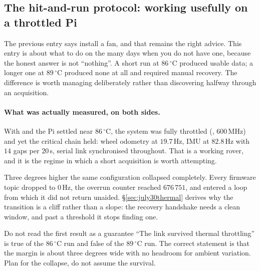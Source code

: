 \subsection{The hit-and-run protocol: working usefully on a throttled Pi}
\label{ap:repro-hitrun}
The previous entry says install a fan, and that remains the right advice. This
entry is about what to do on the many days when you do not have one, because
the honest answer is not ``nothing''. A short run at $86\,^\circ$C produced
usable data; a longer one at $89\,^\circ$C produced none at all and required
manual recovery. The difference is worth managing deliberately rather than
discovering halfway through an acquisition.

\paragraph{What was actually measured, on both sides.}
With  and the Pi settled near $86\,^\circ$C, the
system was fully throttled (, $600$\,MHz) and yet the
critical chain held: wheel odometry at $19.7$\,Hz, IMU at $82.8$\,Hz with
$14$ gaps per $20$\,s, serial link synchronised throughout. That is a working
rover, and it is the regime in which a short acquisition is worth attempting.

Three degrees higher the same configuration collapsed completely. Every
firmware topic dropped to $0$\,Hz, the overrun counter reached $676\,751$, and
 entered a  loop from which it did not
return unaided. \S\ref{sec:july30thermal} derives why the transition is a
cliff rather than a slope: the recovery handshake needs a clean window, and
past a threshold it stops finding one.

\begin{trapbox}{Do not read the first result as a guarantee}
``The link survived thermal throttling'' is true of the $86\,^\circ$C run and
false of the $89\,^\circ$C run. The correct statement is that the margin is
about three degrees wide with no headroom for ambient variation. Plan for the
collapse, do not assume the survival.
\end{trapbox}

